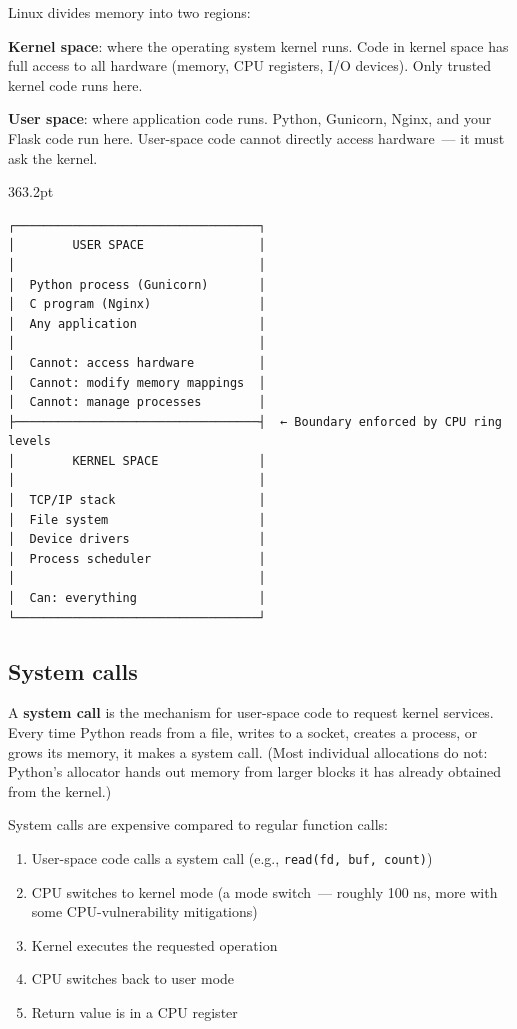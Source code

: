 Linux divides memory into two regions:

\textbf{Kernel space}: where the operating system kernel runs. Code in kernel space has full access to all hardware (memory, CPU registers, I/O devices). Only trusted kernel code runs here.

\textbf{User space}: where application code runs. Python, Gunicorn, Nginx, and your Flask code run here. User-space code cannot directly access hardware~--- it must ask the kernel.

\begin{diagrambox}[short]{363.2pt}
\begin{Verbatim}[fontsize=\fontsize{9.0}{8.55}\selectfont]
┌──────────────────────────────────┐
│        USER SPACE                │
│                                  │
│  Python process (Gunicorn)       │
│  C program (Nginx)               │
│  Any application                 │
│                                  │
│  Cannot: access hardware         │
│  Cannot: modify memory mappings  │
│  Cannot: manage processes        │
├──────────────────────────────────┤  ← Boundary enforced by CPU ring levels
│        KERNEL SPACE              │
│                                  │
│  TCP/IP stack                    │
│  File system                     │
│  Device drivers                  │
│  Process scheduler               │
│                                  │
│  Can: everything                 │
└──────────────────────────────────┘
\end{Verbatim}
\end{diagrambox}

\subsection*{System calls}\label{30-kernel-application-handoff:system-calls}

A \textbf{system call} is the mechanism for user-space code to request kernel services. Every time Python reads from a file, writes to a socket, creates a process, or grows its memory, it makes a system call. (Most individual allocations do not: Python's allocator hands out memory from larger blocks it has already obtained from the kernel.)

System calls are expensive compared to regular function calls:

\begin{enumerate}
\def\labelenumi{\arabic{enumi}.}
\tightlist
\item
  User-space code calls a system call (e.g., \texttt{read(fd,}\allowbreak{}\texttt{\ buf,}\allowbreak{}\texttt{\ count)})
\item
  CPU switches to kernel mode (a mode switch~--- roughly 100 ns, more with some CPU-vulnerability mitigations)
\item
  Kernel executes the requested operation
\item
  CPU switches back to user mode
\item
  Return value is in a CPU register
\end{enumerate}

